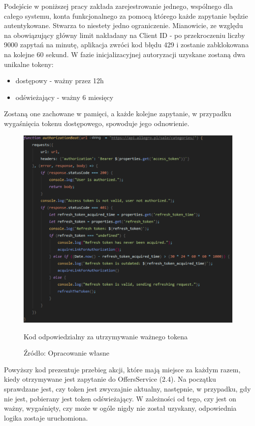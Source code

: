 Podejście w poniższej pracy zakłada zarejestrowanie jednego, wspólnego dla całego systemu, konta funkcjonalnego za pomocą którego każde zapytanie będzie autentykowane. Stwarza to niestety jedno ograniczenie. Mianowicie, ze względu na obowiązujący główny limit nakładany na Client ID  - po przekroczeniu liczby 9000 zapytań na minutę, aplikacja zwróci kod błędu 429 i zostanie zabklokowana na kolejne 60 sekund.\newline
W fazie inicjalizacyjnej autoryzacji uzyskane zostaną dwa unikalne tokeny: 
\begin{itemize}
	\item dostępowy - ważny przez 12h
	\item odświeżający - ważny 6 miesięcy
\end{itemize}
Zostaną one zachowane w pamięci, a każde kolejne zapytanie, w przypadku wygaśnięcia tokenu dostępowego, spowoduje jego odnowienie.
\begin{figure}[H]
	\centering
	\includegraphics[width=\linewidth]{authorization.pdf}
	\caption{\centering Kod odpowiedzialny za utrzymywanie ważnego tokena}
	\caption*{\centering Źródło: {Opracowanie własne}}
\end{figure}
Powyższy kod prezentuje przebieg akcji, które mają miejsce za każdym razem, kiedy otrzymywane jest zapytanie do OffersService (2.4). Na początku sprawdzane jest, czy token jest zwyczajnie aktualny, następnie, w przypadku, gdy nie jest, pobierany jest token odświeżający. W zależności od tego, czy jest on ważny, wygaśnięty, czy może w ogóle nigdy nie został uzyskany, odpowiednia logika zostaje uruchomiona.

